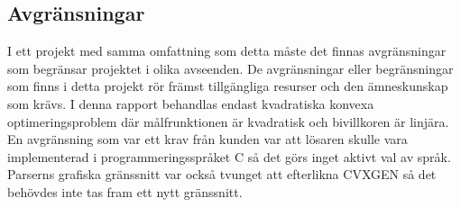 \subsection{Avgränsningar}
I ett projekt med samma omfattning som detta måste det finnas avgränsningar som begränsar projektet i olika avseenden. De avgränsningar eller begränsningar som finns i detta projekt rör främst tillgängliga resurser och den ämneskunskap som krävs.
\newline
\newline
I denna rapport behandlas endast kvadratiska konvexa optimeringsproblem där målfrunktionen är kvadratisk och bivillkoren är linjära. En avgränsning som var ett krav från kunden var att lösaren skulle vara implementerad i programmeringsspråket C så det görs inget aktivt val av språk. Parserns grafiska gränssnitt var också tvunget att efterlikna CVXGEN så det behövdes inte tas fram ett nytt gränssnitt. 